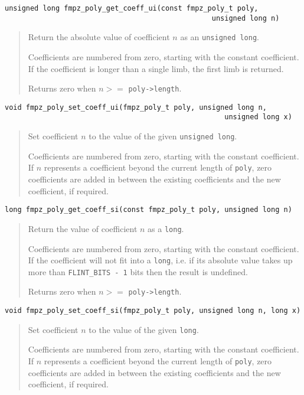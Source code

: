 \documentclass[a4paper,10pt]{article}
\newcommand{\code}{\lstinline}
\begin{document}
\begin{lstlisting}
unsigned long fmpz_poly_get_coeff_ui(const fmpz_poly_t poly, 
                                                 unsigned long n)
\end{lstlisting}
\begin{quote}
Return the absolute value of coefficient $n$ as an \code{unsigned long}.

Coefficients are numbered from zero, starting with the constant coefficient. If the coefficient is longer than a single limb, the first limb is returned.

Returns zero when $n >= $ \code{poly->length}. 
\end{quote}

\begin{lstlisting}
void fmpz_poly_set_coeff_ui(fmpz_poly_t poly, unsigned long n, 
                                                    unsigned long x) 
\end{lstlisting}
\begin{quote}
Set coefficient $n$ to the value of the given \code{unsigned long}. 

Coefficients are numbered from zero, starting with the constant coefficient. If $n$ represents a coefficient beyond the current length of \code{poly}, zero coefficients are added in between the existing coefficients and the new coefficient, if required.
\end{quote}

\begin{lstlisting}
long fmpz_poly_get_coeff_si(const fmpz_poly_t poly, unsigned long n)
\end{lstlisting}
\begin{quote}
Return the value of coefficient $n$ as a \code{long}.

Coefficients are numbered from zero, starting with the constant coefficient. If the coefficient will not fit into a \code{long}, i.e. if its absolute value takes up more than \code{FLINT_BITS - 1} bits then the result is undefined.

Returns zero when $n >= $ \code{poly->length}. 
\end{quote}

\begin{lstlisting}
void fmpz_poly_set_coeff_si(fmpz_poly_t poly, unsigned long n, long x) 
\end{lstlisting}
\begin{quote}
Set coefficient $n$ to the value of the given \code{long}. 

Coefficients are numbered from zero, starting with the constant coefficient. If $n$ represents a coefficient beyond the current length of \code{poly}, zero coefficients are added in between the existing coefficients and the new coefficient, if required.
\end{quote}
\end{document}
